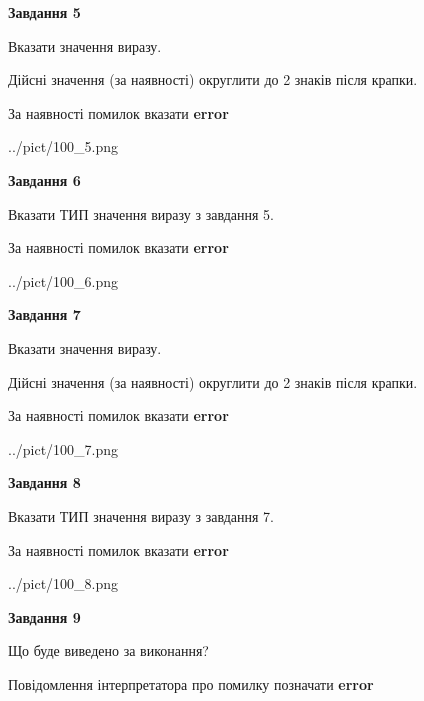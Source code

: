 \documentclass[11pt, ukrainian]{article}
\begin{document}
{\begin {large}
{\begin {center}\textbf{Завдання 5}\end {center}}\par
Вказати значення виразу. \par
Дійсні значення (за наявності) округлити до 2 знаків після крапки. \par
За наявності помилок вказати \textbf{error}

\begin{center}
	{../pict/100_5.png}
\end{center}
\newpage

{\begin {center}\textbf{Завдання 6}\end {center}}\par
Вказати ТИП значення виразу з завдання 5. \par
За наявності помилок вказати \textbf{error}

\begin{center}
	{../pict/100_6.png}
\end{center}
\newpage

{\begin {center}\textbf{Завдання 7}\end {center}}\par
Вказати значення виразу. \par
Дійсні значення (за наявності) округлити до 2 знаків після крапки. \par
За наявності помилок вказати \textbf{error}

\begin{center}
	{../pict/100_7.png}
\end{center}
\newpage

{\begin {center}\textbf{Завдання 8}\end {center}}\par
Вказати ТИП значення виразу з завдання 7. \par
За наявності помилок вказати \textbf{error}

\begin{center}
	{../pict/100_8.png}
\end{center}
\newpage

{\begin {center}\textbf{Завдання 9}\end {center}}\par
Що буде виведено за виконання? \par
Повідомлення інтерпретатора про помилку позначати \textbf{error}


\end{large}}
\end{document}

